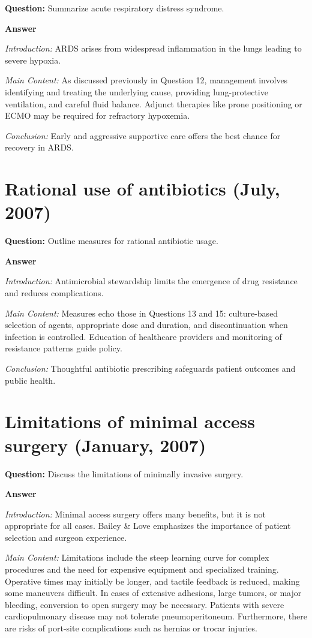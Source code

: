 \documentclass{article}
\begin{document}
\textbf{Question:} Summarize acute respiratory distress syndrome.

\textbf{Answer}

\emph{Introduction:} ARDS arises from widespread inflammation in the lungs leading to severe hypoxia.

\emph{Main Content:} As discussed previously in Question 12, management involves identifying and treating the underlying cause, providing lung-protective ventilation, and careful fluid balance. Adjunct therapies like prone positioning or ECMO may be required for refractory hypoxemia.

\emph{Conclusion:} Early and aggressive supportive care offers the best chance for recovery in ARDS.


\section{Rational use of antibiotics (July, 2007)}


\textbf{Question:} Outline measures for rational antibiotic usage.

\textbf{Answer}

\emph{Introduction:} Antimicrobial stewardship limits the emergence of drug resistance and reduces complications.

\emph{Main Content:} Measures echo those in Questions 13 and 15: culture-based selection of agents, appropriate dose and duration, and discontinuation when infection is controlled. Education of healthcare providers and monitoring of resistance patterns guide policy.

\emph{Conclusion:} Thoughtful antibiotic prescribing safeguards patient outcomes and public health.


\section{Limitations of minimal access surgery (January, 2007)}


\textbf{Question:} Discuss the limitations of minimally invasive surgery.

\textbf{Answer}

\emph{Introduction:} Minimal access surgery offers many benefits, but it is not appropriate for all cases. Bailey \& Love emphasizes the importance of patient selection and surgeon experience.

\emph{Main Content:} Limitations include the steep learning curve for complex procedures and the need for expensive equipment and specialized training. Operative times may initially be longer, and tactile feedback is reduced, making some maneuvers difficult. In cases of extensive adhesions, large tumors, or major bleeding, conversion to open surgery may be necessary. Patients with severe cardiopulmonary disease may not tolerate pneumoperitoneum. Furthermore, there are risks of port-site complications such as hernias or trocar injuries.
\end{document}
